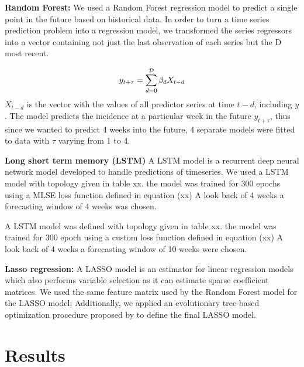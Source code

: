\documentclass[12pt]{report}
\begin{document}
\begin{description}
 \item \textbf{Random Forest:}
 We used a Random Forest regression model to predict a single point in the future based on historical data. In order to turn a time series prediction problem into a regression model, we transformed the series regressors into a vector containing not just the last observation of each series but the {\cal D} most recent.
 
 \begin{equation}
y_{t+\tau} = \sum_{d=0}^{\cal D} \beta_d X_{t-d}
\end{equation}
$X_{t-d}$ is the vector with the values of all predictor series at time $t-d$, including $y$. The model predicts the incidence at a particular week in the future $y_{t+\tau}$, thus since we wanted to predict 4 weeks into the future, 4 separate models were fitted to data with $\tau$ varying from 1 to 4.

 
 \item \textbf{Long short term memory (LSTM)}
 A LSTM model is a recurrent deep neural network model developed to handle predictions of timeseries. We used a LSTM model with topology given in table xx. the model was trained for 300 epochs using a MLSE loss function defined in equation (xx) A look back 
of 4 weeks a forecasting window of 4 weeks was chosen.

 
 A LSTM model was defined with topology given in table xx. the model was trained 
for 300 epoch using a custom loss function defined in equation (xx) A look back 
of 4 weeks a forecasting window of 10 weeks were chosen.


 
 \item \textbf{Lasso regression:}
  A LASSO model is an estimator for linear regression models which also performs variable selection as it can estimate sparse coefficient matrices. We used the same feature matrix used by the Random Forest model for the LASSO model; Additionally, we applied an evolutionary tree-based optimization procedure proposed by \citet{Olson_Bartley_Urbanowicz_Moore_2016} to define the final LASSO model.
 
\end{description}


\section{Results}
\end{document}
